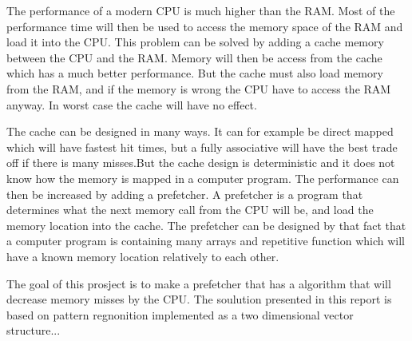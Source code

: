 The performance of a modern CPU is much higher than the RAM. Most of the performance time will then be used to access the memory space of the RAM and load it into the CPU. This problem can be solved by adding a cache memory between the CPU and the RAM. Memory will then be access from the cache which has a much better performance. But the cache must also load memory from the RAM, and if the memory is wrong the CPU have to access the RAM anyway. In worst case the cache will have no effect.

The cache can be designed in many ways. It can for example be direct mapped which will have fastest hit times, but a fully associative will have the best trade off if there is many misses.But the cache design is deterministic and it does not know how the memory is mapped in a computer program. The performance can then be increased by adding a prefetcher. A prefetcher is a program that determines what the next memory call from the CPU will be, and load the memory location into the cache. The prefetcher can be designed by that fact that a computer program is containing many arrays and repetitive function which will have a known memory location relatively to each other.

The goal of this prosject is to make a prefetcher that has a algorithm that will decrease memory misses by the CPU. The soulution presented in this report is based on pattern regnonition implemented as a two dimensional vector structure...
